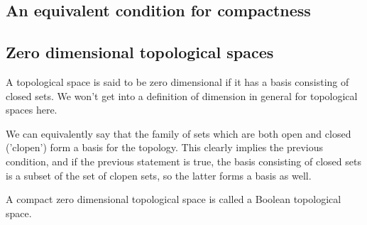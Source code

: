 \documentclass{article}
\begin{document}
      \subsection{An equivalent condition for compactness}

%
%
%
%
%
%
%
      \subsection{Zero dimensional topological spaces}

        A topological space is said to be zero dimensional if it has a basis
        consisting of closed sets. We won't get into a definition of dimension
        in general for topological spaces here.

        We can equivalently say that the family of sets which are both open and
        closed ('clopen') form a basis for the topology. This clearly implies
        the previous condition, and if the previous statement is true, the basis
        consisting of closed sets is a subset of the set of clopen sets, so the
        latter forms a basis as well.

        A compact zero dimensional topological space is called a Boolean
        topological space.
\end{document}
